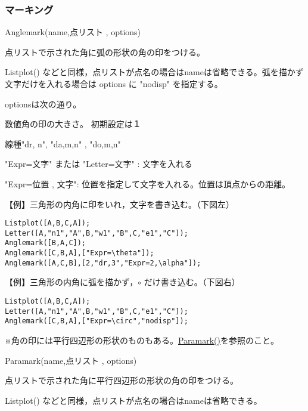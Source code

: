 \documentclass[papersize,a4paper,10pt,uplatex]{jsarticle}
\begin{document}
\subsubsection{マーキング}
\begin{description}

\hypertarget{anglemark}{}
\item[関数]Anglemark(name,点リスト , options)
\item[機能]点リストで示された角に弧の形状の角の印をつける。
\item[説明]Listplot() などと同様，点リストが点名の場合はnameは省略できる。弧を描かず文字だけを入れる場合は options に "nodisp" を指定する。

optionsは次の通り。

数値角の印の大きさ。 初期設定は１

線種"dr, n", "da,m,n" , "do,m,n"

"Expr=文字" または "Letter=文字" : 文字を入れる

"Expr=位置 , 文字": 位置を指定して文字を入れる。位置は頂点からの距離。

\vspace{\baselineskip}
【例】三角形の内角に印をいれ，文字を書き込む。（下図左）
\begin{verbatim}
Listplot([A,B,C,A]);
Letter([A,"n1","A",B,"w1","B",C,"e1","C"]);
Anglemark([B,A,C]);
Anglemark([C,B,A],["Expr=\theta"]);
Anglemark([A,C,B],[2,"dr,3","Expr=2,\alpha"]);
\end{verbatim}

【例】三角形の内角に弧を描かず，$\circ$ だけ書き込む。（下図右）
\begin{verbatim}
Listplot([A,B,C,A]);
Letter([A,"n1","A",B,"w1","B",C,"e1","C"]);
Anglemark([C,B,A],["Expr=\circ","nodisp"]);
\end{verbatim}


\hspace{5mm}

※角の印には平行四辺形の形状のものもある。\hyperlink{paramark}{Paramark()}を参照のこと。

\vspace{\baselineskip}
\hypertarget{paramark}{}
\item[関数]Paramark(name,点リスト , options)
\item[機能]点リストで示された角に平行四辺形の形状の角の印をつける。
\item[説明]Listplot() などと同様，点リストが点名の場合はnameは省略できる。


\end{description}
\end{document}
